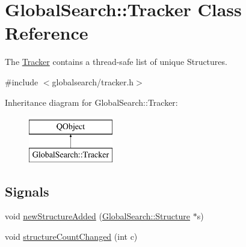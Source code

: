 \hypertarget{classGlobalSearch_1_1Tracker}{\section{Global\-Search\-:\-:Tracker Class Reference}
\label{classGlobalSearch_1_1Tracker}
}


The \hyperlink{classGlobalSearch_1_1Tracker}{Tracker} contains a thread-\/safe list of unique Structures.  




{\ttfamily \#include $<$globalsearch/tracker.\-h$>$}

Inheritance diagram for Global\-Search\-:\-:Tracker\-:\begin{figure}[H]
\begin{center}
\leavevmode
\includegraphics[height=2.000000cm]{classGlobalSearch_1_1Tracker}
\end{center}
\end{figure}
\subsection*{Signals}
\begin{DoxyCompactItemize}
\item 
void \hyperlink{classGlobalSearch_1_1Tracker_ab52b21fb3c4af98fe959bb904f6d029d}{new\-Structure\-Added} (\hyperlink{classGlobalSearch_1_1Structure}{Global\-Search\-::\-Structure} $\ast$s)
\item 
void \hyperlink{classGlobalSearch_1_1Tracker_aa678a5cf9b95b57c51ae19dd6a116613}{structure\-Count\-Changed} (int c)
\end{DoxyCompactItemize}
